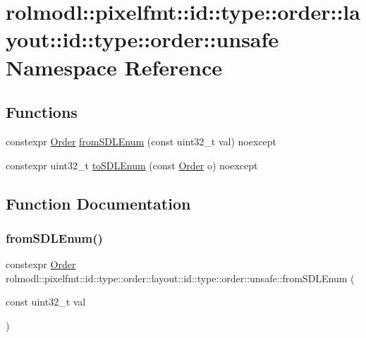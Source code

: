 \hypertarget{namespacerolmodl_1_1pixelfmt_1_1id_1_1type_1_1order_1_1layout_1_1id_1_1type_1_1order_1_1unsafe}{}\section{rolmodl\+::pixelfmt\+::id\+::type\+::order\+::layout\+::id\+::type\+::order\+::unsafe Namespace Reference}
\label{namespacerolmodl_1_1pixelfmt_1_1id_1_1type_1_1order_1_1layout_1_1id_1_1type_1_1order_1_1unsafe}
\subsection*{Functions}
\begin{DoxyCompactItemize}
\item 
constexpr \mbox{\hyperlink{namespacerolmodl_1_1pixelfmt_1_1id_1_1type_a01a03db37a556bc98643bd88b2f5b6b3}{Order}} \mbox{\hyperlink{namespacerolmodl_1_1pixelfmt_1_1id_1_1type_1_1order_1_1layout_1_1id_1_1type_1_1order_1_1unsafe_add3392c327d0c510b68d16c59aaf2142}{from\+S\+D\+L\+Enum}} (const uint32\+\_\+t val) noexcept
\item 
constexpr uint32\+\_\+t \mbox{\hyperlink{namespacerolmodl_1_1pixelfmt_1_1id_1_1type_1_1order_1_1layout_1_1id_1_1type_1_1order_1_1unsafe_a4c5b411b9023a65efd90f410d7652ae5}{to\+S\+D\+L\+Enum}} (const \mbox{\hyperlink{namespacerolmodl_1_1pixelfmt_1_1id_1_1type_a01a03db37a556bc98643bd88b2f5b6b3}{Order}} o) noexcept
\end{DoxyCompactItemize}


\subsection{Function Documentation}
\mbox{\label{namespacerolmodl_1_1pixelfmt_1_1id_1_1type_1_1order_1_1layout_1_1id_1_1type_1_1order_1_1unsafe_add3392c327d0c510b68d16c59aaf2142}} 
\subsubsection{\texorpdfstring{fromSDLEnum()}{fromSDLEnum()}}
{\footnotesize\ttfamily constexpr \mbox{\hyperlink{namespacerolmodl_1_1pixelfmt_1_1id_1_1type_a01a03db37a556bc98643bd88b2f5b6b3}{Order}} rolmodl\+::pixelfmt\+::id\+::type\+::order\+::layout\+::id\+::type\+::order\+::unsafe\+::from\+S\+D\+L\+Enum (\begin{DoxyParamCaption}\item[{const uint32\+\_\+t}]{val }\end{DoxyParamCaption})\hspace{0.3cm}{\ttfamily [noexcept]}}



